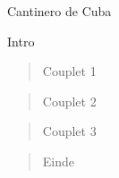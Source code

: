 \begin{song}[]{Cantinero de Cuba}
\rhythmandkey{}{}

\begin{instrumental}{Intro}
\measure{} \measure{} \measure{} \measure{} \measure{} \measure{} \measure{} \measure{}
\measure{} \measure{} \measure{} \measure{} \measure{} \measure{} \measure{} \measure{}
\end{instrumental}

\begin{verse}{Couplet 1}
\end{verse}

\begin{verse}{Couplet 2}
\end{verse}

\begin{verse}{Couplet 3}
\end{verse}

\begin{verse}{Einde}
\end{verse}
\end{song}

\clearpage
\begin{translation}[]

\end{translation}

